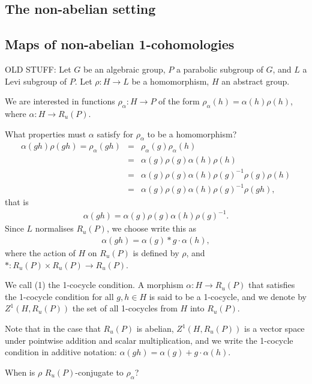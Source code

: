 \subsection{The non-abelian setting}

\subsection{Maps of non-abelian 1-cohomologies}

OLD STUFF:
Let $G$ be an algebraic group, $P$ a parabolic subgroup of $G$, and $L$ a Levi subgroup of $P$. Let $\rho: H \rightarrow L$ be a homomorphism, $H$ an abstract group.  

We are interested in functions $\rho_\alpha : H \rightarrow P$ of the form $\rho_\alpha(h) = \alpha(h)\rho(h)$, where $\alpha:H \rightarrow R_u(P)$.

What properties must $\alpha$ satisfy for $\rho_\alpha$ to be a homomorphism?
\begin{eqnarray*}
\alpha(gh)\rho(gh) = \rho_\alpha(gh) &=& \rho_\alpha(g)\rho_\alpha(h) \\
	&=& \alpha(g)\rho(g)\alpha(h)\rho(h) \\
	&=& \alpha(g)\rho(g)\alpha(h)\rho(g)^{-1}\rho(g)\rho(h)\\
	&=&\alpha(g)\rho(g)\alpha(h)\rho(g)^{-1}\rho(gh),
\end{eqnarray*}
that is
\begin{eqnarray*}
\alpha(gh) = \alpha(g)\rho(g)\alpha(h)\rho(g)^{-1}. 
\end{eqnarray*}
Since $L$ normalises $R_u(P)$, we choose write this as 
\begin{eqnarray}
\alpha(gh)=\alpha(g)*g\cdot\alpha(h),
\end{eqnarray}
where the action of $H$ on $R_u(P)$ is defined by $\rho$, and $*:R_u(P)\times R_u(P)\rightarrow R_u(P)$. 

We call (1) the 1-cocycle condition. A morphism $\alpha:H\rightarrow R_u(P)$ that satisfies the 1-cocycle condition for all $g,h\in H$ is said to be a 1-cocycle, and we denote by $Z^1(H,R_u(P))$ the set of all 1-cocycles from $H$ into $R_u(P)$. 

Note that in the case that $R_u(P)$ is abelian, $Z^1(H,R_u(P))$ is a vector space under pointwise addition and scalar multiplication, and we write the 1-cocycle condition in additive notation: $\alpha(gh)=\alpha(g)+g\cdot\alpha(h)$.

When is $\rho$ $R_u(P)$-conjugate to $\rho_\alpha$?


